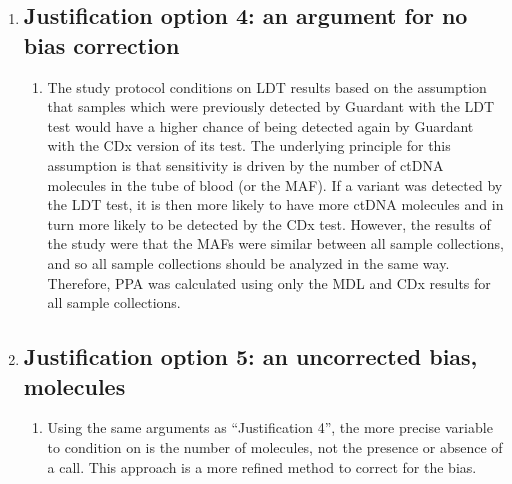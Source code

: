 \begin{enumerate}
	\item \subsection{Justification option 4: an argument for no bias correction}
	\begin{enumerate}
	    \item The study protocol conditions on LDT results based on the assumption
	    that samples which were previously detected by Guardant with the LDT test 
	    would have a higher chance 
	    of being detected again by Guardant with the CDx version of its test. 
	    The underlying principle for this assumption
	    is that sensitivity is driven by the number of ctDNA molecules in the tube of blood (or the
	    MAF). If a variant was detected by the LDT test, it is then more likely to have more
	    ctDNA molecules and in turn more likely to be detected by the CDx test. However,
	    the results of the study were that the MAFs were similar between all sample collections,
	    and so all sample collections should be analyzed in the same way. Therefore, 
	    PPA was calculated using only the MDL and CDx results for all sample collections.
	\end{enumerate}
	
	\item \subsection{Justification option 5: an uncorrected bias, molecules}
	\begin{enumerate}
	    \item Using the same arguments as ``Justification 4'', the more precise
	    variable to condition on is the number of molecules, not the presence or
	    absence of a call. This approach is a more refined method to correct for the bias.
	\end{enumerate}
	

\end{enumerate}
